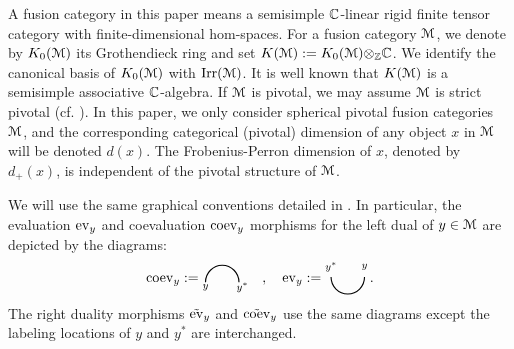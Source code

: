 \documentclass{amsart}
\begin{document}
A fusion category in this paper means a semisimple $\mathbb{C}$-linear rigid finite
tensor category with finite-dimensional hom-spaces. For a fusion category
$\EuScript{M}$, we denote by $K_0(\EuScript{M})$ its Grothendieck ring and set
$K(\EuScript{M}):=K_0(\EuScript{M}){\otimes}_{\mathbb{Z}} \mathbb{C}$. We identify the canonical basis of
$K_0(\EuScript{M})$ with $\operatorname{Irr}(\EuScript{M})$. It is well known that $K(\EuScript{M})$ is a
semisimple associative $\mathbb{C}$-algebra. If $\EuScript{M}$ is pivotal,  we may assume $\EuScript{M}$ is strict pivotal (cf. \cite[Thm. 2.2]{NSind}). In this paper, we only consider spherical pivotal fusion categories $\EuScript{M}$, and the corresponding categorical (pivotal) dimension of any object $x$ in $\EuScript{M}$ will be denoted $d(x)$. The Frobenius-Perron dimension of $x$, denoted by $d_+(x)$, is independent of the pivotal structure of $\EuScript{M}$.


We will use the same graphical conventions detailed in \cite{DNRX2025}. In particular,  the evaluation $\operatorname{ev}_y$ and coevaluation $\operatorname{coev}_y$ morphisms for the left dual of $y \in \EuScript{M}$ are depicted by the diagrams:
\[
\coev_y := \vcenter{\hbox{%
\begin{tikzpicture}[x=1pc, y=1pc, thick]
  \draw (0,2.1) arc[start angle=180, end angle=0, radius=1pc];
  \node[inner sep=0pt, outer sep=0pt] at (0,1.8) {$\scriptstyle y$};
  \node[inner sep=0pt, outer sep=0pt] at (2.2,1.8) {$\scriptstyle y^*$};
\end{tikzpicture}%
}}\quad, \quad
\ev_y:=\vcenter{\hbox{%
\begin{tikzpicture}[x=1pc, y=1pc, thick]
  \draw (8,2.7) arc[start angle=180, end angle=360, radius=1pc];
  \node[inner sep=0pt, outer sep=0pt] at (8,3.3) {$\scriptstyle y^*$};
  \node[inner sep=0pt, outer sep=0pt] at (10,3.3) {$\scriptstyle y$};
\end{tikzpicture}%
}}\,.%
\]
The right duality morphisms $\tilde {\operatorname{ev}}_y$ and $\tilde {\operatorname{coev}}_y$ use the same diagrams except the labeling locations of $y$ and $y^*$ are interchanged.
\end{document}
